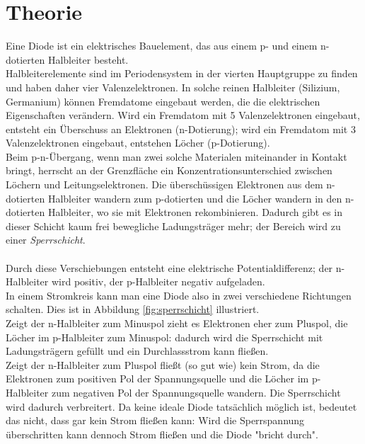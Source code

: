 \documentclass[12pt,a4paper,twopage]{article}
\begin{document}
\section{Theorie}
Eine Diode ist ein elektrisches Bauelement, das aus einem p- und einem n-dotierten Halbleiter besteht.\\
Halbleiterelemente sind im Periodensystem in der vierten Hauptgruppe zu finden und haben daher vier Valenzelektronen. In solche reinen Halbleiter (Silizium, Germanium) können Fremdatome eingebaut werden, die die elektrischen Eigenschaften verändern. Wird ein Fremdatom mit 5 Valenzelektronen eingebaut, entsteht ein Überschuss an Elektronen (n-Dotierung); wird ein Fremdatom mit 3 Valenzelektronen eingebaut, entstehen Löcher (p-Dotierung).\\
Beim p-n-Übergang, wenn man zwei solche Materialen miteinander in Kontakt bringt, herrscht an der Grenzfläche ein Konzentrationsunterschied zwischen Löchern und Leitungselektronen. Die überschüssigen Elektronen aus dem n-dotierten Halbleiter wandern zum p-dotierten und die Löcher wandern in den n-dotierten Halbleiter, wo sie mit Elektronen rekombinieren. Dadurch gibt es in dieser Schicht kaum frei bewegliche Ladungsträger mehr; der Bereich wird zu einer \textit{Sperrschicht}.\\
\\
Durch diese Verschiebungen entsteht eine elektrische Potentialdifferenz; der n-Halbleiter wird positiv, der p-Halbleiter negativ aufgeladen.\\
In einem Stromkreis kann man eine Diode also in zwei verschiedene Richtungen schalten. Dies ist in Abbildung \ref{fig:sperrschicht} illustriert.\\
Zeigt der n-Halbleiter zum Minuspol zieht es Elektronen eher zum Pluspol, die Löcher im p-Halbleiter zum Minuspol: dadurch wird die Sperrschicht mit Ladungsträgern gefüllt und ein Durchlassstrom kann fließen.\\
Zeigt der n-Halbleiter zum Pluspol fließt (so gut wie) kein Strom, da die Elektronen zum positiven Pol der Spannungsquelle und die Löcher im p-Halbleiter zum negativen Pol der Spannungsquelle wandern. Die Sperrschicht wird dadurch verbreitert. Da keine ideale Diode tatsächlich möglich ist, bedeutet das nicht, dass gar kein Strom fließen kann: Wird die Sperrspannung überschritten kann dennoch Strom fließen und die Diode "bricht durch".
\end{document}
